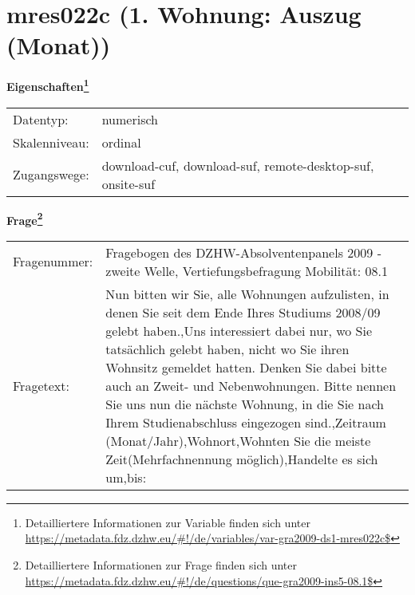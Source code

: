 
    \setcounter{footnote}{0}

    \vspace*{-1.8cm}
	\section{mres022c (1. Wohnung: Auszug (Monat))}
	\label{section:mres022c}



    \vspace*{0.5cm}
    \noindent\textbf{Eigenschaften\footnote{Detailliertere Informationen zur Variable finden sich unter
		\url{https://metadata.fdz.dzhw.eu/\#!/de/variables/var-gra2009-ds1-mres022c$}}}\\
	\begin{tabularx}{\hsize}{@{}lX}
	Datentyp: & numerisch \\
	Skalenniveau: & ordinal \\
	Zugangswege: &
	  download-cuf, 
	  download-suf, 
	  remote-desktop-suf, 
	  onsite-suf
 \\
    \end{tabularx}



				\vspace*{0.5cm}
                \noindent\textbf{Frage\footnote{Detailliertere Informationen zur Frage finden sich unter
		              \url{https://metadata.fdz.dzhw.eu/\#!/de/questions/que-gra2009-ins5-08.1$}}}\\
				\begin{tabularx}{\hsize}{@{}lX}
					Fragenummer: &
					  Fragebogen des DZHW-Absolventenpanels 2009 - zweite Welle, Vertiefungsbefragung Mobilität:
					  08.1
 \\
					Fragetext: & Nun bitten wir Sie, alle Wohnungen aufzulisten, in denen Sie seit dem Ende Ihres Studiums 2008/09 gelebt haben.,Uns interessiert dabei nur, wo Sie tatsächlich gelebt haben, nicht wo Sie ihren Wohnsitz gemeldet hatten. Denken Sie dabei bitte auch an Zweit- und Nebenwohnungen. Bitte nennen Sie uns nun die nächste Wohnung, in die Sie nach Ihrem Studienabschluss eingezogen sind.,Zeitraum (Monat/Jahr),Wohnort,Wohnten Sie die meiste Zeit(Mehrfachnennung möglich),Handelte es sich um,bis: \\
				\end{tabularx}





